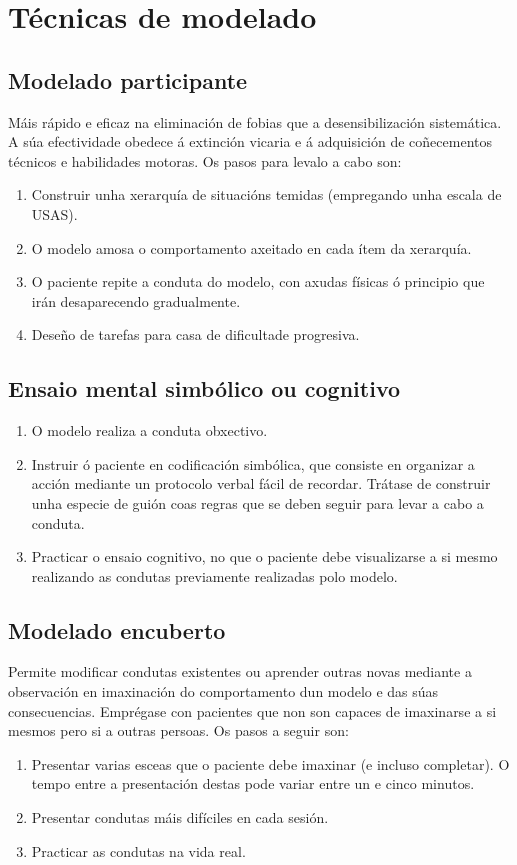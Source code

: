 \documentclass[a4paper,11pt]{article}
\begin{document}
\section{Técnicas de modelado}
\subsection{Modelado participante}
Máis rápido e eficaz na eliminación de fobias que a desensibilización sistemática. A súa efectividade obedece á extinción vicaria e á adquisición de coñecementos técnicos e habilidades motoras. Os pasos para levalo a cabo son:
\begin{enumerate}
	\item Construir unha xerarquía de situacións temidas (empregando unha escala de USAS).
	\item O modelo amosa o comportamento axeitado en cada ítem da xerarquía.
	\item O paciente repite a conduta do modelo, con axudas físicas ó principio que irán 
	desaparecendo gradualmente.
	\item Deseño de tarefas para casa de dificultade progresiva.
\end{enumerate}

\subsection{Ensaio mental simbólico ou cognitivo}
\begin{enumerate}
	\item O modelo realiza a conduta obxectivo.
	\item Instruir ó paciente en codificación simbólica, que consiste en organizar a acción mediante 
	un protocolo verbal fácil de recordar. Trátase de construir unha especie de guión coas regras que 
	se deben seguir para levar a cabo a conduta.
	\item Practicar o ensaio cognitivo, no que o paciente debe visualizarse a si mesmo realizando as 
	condutas previamente realizadas polo modelo.
\end{enumerate}

\subsection{Modelado encuberto}
Permite modificar condutas existentes ou aprender outras novas mediante a observación en imaxinación do comportamento dun modelo e das súas consecuencias. Emprégase con pacientes que non son capaces de imaxinarse a si mesmos pero si a outras persoas. Os pasos a seguir son:
\begin{enumerate}
	\item Presentar varias esceas que o paciente debe imaxinar (e incluso completar). O tempo entre a 
	presentación destas pode variar entre un e cinco minutos.
	\item Presentar condutas máis difíciles en cada sesión.
	\item Practicar as condutas na vida real.
\end{enumerate}
\end{document}
